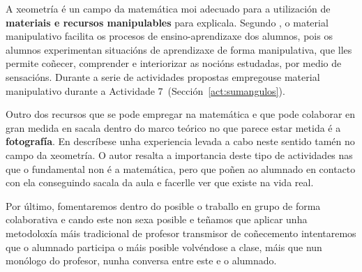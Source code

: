 A xeometría é un campo da matemática moi adecuado para a utilización de \textbf{materiais e recursos manipulables} para explicala. Segundo ,  o material manipulativo facilita os procesos de ensino-aprendizaxe dos alumnos, pois os alumnos experimentan situacións de aprendizaxe de forma manipulativa, que lles permite coñecer, comprender e interiorizar as nocións estudadas, por medio de sensacións. Durante a serie de actividades propostas empregouse material manipulativo durante a Actividade 7~(Sección~\ref{act:sumangulos}).

Outro dos recursos que se pode empregar na matemática e que pode colaborar en gran medida en sacala dentro do marco teórico no que parece estar metida é a \textbf{fotografía}. En  descríbese unha experiencia levada a cabo neste sentido tamén no campo da xeometría. O autor resalta a importancia deste tipo de actividades nas que o fundamental non é a matemática, pero que poñen ao alumnado en contacto con ela conseguindo sacala da aula e facerlle ver que existe na vida real.

Por último, fomentaremos dentro do posible o traballo en grupo de forma colaborativa e cando este non sexa posible e teñamos que aplicar unha metodoloxía máis tradicional de profesor transmisor de coñecemento intentaremos que o alumnado participa o máis posible volvéndose a clase, máis que nun monólogo do profesor, nunha conversa entre este e o alumnado.

